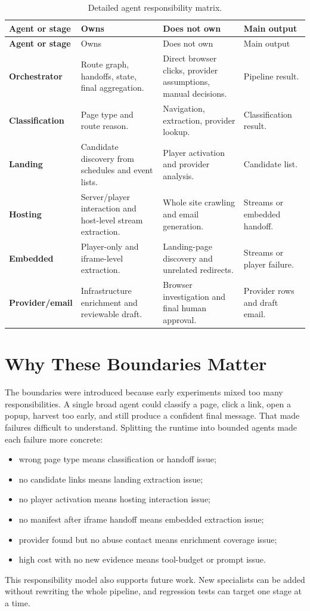 \begin{longtable}{>{\raggedright\arraybackslash\bfseries}p{3.0cm}
                  >{\raggedright\arraybackslash}p{4.1cm}
                  >{\raggedright\arraybackslash}p{4.1cm}
                  >{\raggedright\arraybackslash}p{2.7cm}}
\caption{Detailed agent responsibility matrix.}
\label{tab:detailed-agent-responsibility-matrix}\\
\toprule
\rowcolor{accent!8}
Agent or stage & Owns & Does not own & Main output \\
\midrule
\endfirsthead
\toprule
\rowcolor{accent!8}
Agent or stage & Owns & Does not own & Main output \\
\midrule
\endhead
\bottomrule
\endfoot
Orchestrator & Route graph, handoffs, state, final aggregation. & Direct
browser clicks, provider assumptions, manual decisions. & Pipeline result. \\
Classification & Page type and route reason. & Navigation, extraction, provider
lookup. & Classification result. \\
Landing & Candidate discovery from schedules and event lists. & Player
activation and provider analysis. & Candidate list. \\
Hosting & Server/player interaction and host-level stream extraction. & Whole
site crawling and email generation. & Streams or embedded handoff. \\
Embedded & Player-only and iframe-level extraction. & Landing-page discovery
and unrelated redirects. & Streams or player failure. \\
Provider/email & Infrastructure enrichment and reviewable draft. & Browser
investigation and final human approval. & Provider rows and draft email. \\
\end{longtable}

\section{Why These Boundaries Matter}

The boundaries were introduced because early experiments mixed too many
responsibilities. A single broad agent could classify a page, click a link,
open a popup, harvest too early, and still produce a confident final message.
That made failures difficult to understand. Splitting the runtime into bounded
agents made each failure more concrete:

\begin{itemize}
  \item wrong page type means classification or handoff issue;
  \item no candidate links means landing extraction issue;
  \item no player activation means hosting interaction issue;
  \item no manifest after iframe handoff means embedded extraction issue;
  \item provider found but no abuse contact means enrichment coverage issue;
  \item high cost with no new evidence means tool-budget or prompt issue.
\end{itemize}

This responsibility model also supports future work. New specialists can be
added without rewriting the whole pipeline, and regression tests can target one
stage at a time.
